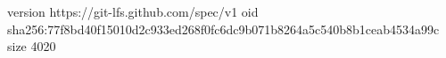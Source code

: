 version https://git-lfs.github.com/spec/v1
oid sha256:77f8bd40f15010d2c933ed268f0fc6dc9b071b8264a5c540b8b1ceab4534a99c
size 4020
